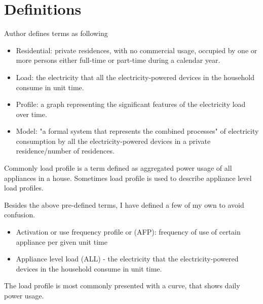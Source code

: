 \documentclass[
11pt, %
english, %
singlespacing, %
headsepline, %
]{MastersDoctoralThesis} %
\begin{document}
\chapter{Definitions}

Author \cite{Review2021} defines terms as following

\begin{itemize}
	\item Residential: private residences, with no commercial usage, occupied by one or more persons either full-time or part-time during a calendar year.
	\item Load: the electricity that all the electricity-powered devices in the household consume in unit time.
	\item Profile: a graph representing the significant features of the electricity load over time.
	\item Model: "a formal system that represents the combined processes" \cite{KAVOUSIAN2013184} of electricity consumption by all the electricity-powered devices in a private residence/number of residences.
\end{itemize}

Commonly load profile is a term defined as aggregated power usage of all appliances in a house. 
Sometimes load profile is used to describe appliance level load profiles. 

Besides the above pre-defined terms, I have defined a few of my own to avoid confusion.
\begin{itemize}
	\item Activation or use frequency profile or (AFP): frequency of use of certain appliance per given unit time
	\item Appliance level load (ALL) - the electricity that the electricity-powered devices in the household consume in unit time.
\end{itemize}

The load profile is most commonly presented with a curve, that shows daily power usage.
\end{document}
